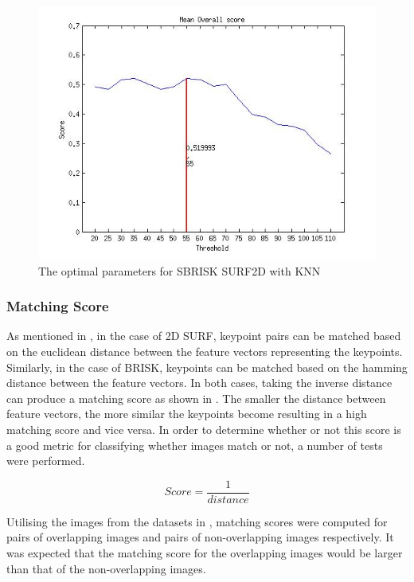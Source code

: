 \documentclass{article}
\begin{document}
\begin{figure}[h!]
\begin{minipage}[b]{0.5\linewidth}
\includegraphics[scale=0.5]{../Drawings/OptimalParameters_SBRISK_SURF2D_KNN.jpg}
\caption{The optimal parameters for SBRISK SURF2D with KNN}
\label{fig:sbriskHammingOptimal}
\end{minipage}
\end{figure}


\subsubsection{Matching Score}
\label{sec:matchingScore}
As mentioned in , in the case of 2D SURF, keypoint pairs can be matched based on the euclidean distance between the feature vectors representing the keypoints. Similarly, in the case of BRISK, keypoints can be matched based on the hamming distance between the feature vectors. In both cases, taking the inverse distance can produce a matching score as shown in . The smaller the distance between feature vectors, the more similar the keypoints become resulting in a high matching score and vice versa. In order to determine whether or not this score is a good metric for classifying whether images match or not, a number of tests were performed.

\begin{equation}
Score = \frac{1}{distance}
\label{eqn:inverseDistance}
\end{equation}

Utilising the images from the datasets in , matching scores were computed for pairs of overlapping images and pairs of non-overlapping images respectively. It was expected that the matching score for the overlapping images would be larger than that of the non-overlapping images. \\
\end{document}
